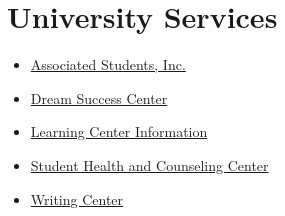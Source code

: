 \hypertarget{university-services}{%
\section{University Services}\label{university-services}}

\begin{itemize}
\tightlist
\item
  \href{http://fresnostateasi.org/}{Associated Students, Inc.}
\item
  \href{http://fresnostate.edu/studentaffairs/dsc/index.html}{Dream
  Success Center}
\item
  \href{http://fresnostate.edu/studentaffairs/lrc}{Learning Center
  Information}
\item
  \href{https://www.fresnostate.edu/studentaffairs/health/}{Student
  Health and Counseling Center}
\item
  \href{http://www.fresnostate.edu/artshum/writingcenter/}{Writing
  Center}
\end{itemize}
